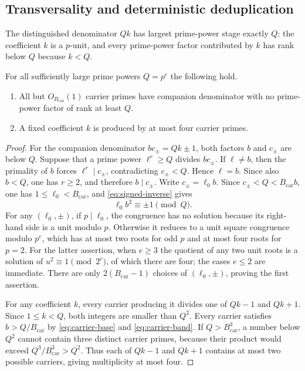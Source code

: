 \subsection{Transversality and deterministic deduplication}

The distinguished denominator $Qk$ has largest prime-power stage exactly $Q$: the coefficient $k$ is a $p$-unit, and every prime-power factor contributed by $k$ has rank below $Q$ because $k<Q$.

\begin{lemma}\label{lem:carrier-transversality}
For all sufficiently large prime powers $Q=p^e$ the following hold.
\begin{enumerate}
\item All but $O_{B_{\mathrm{car}}}(1)$ carrier primes have companion denominator with no prime-power factor of rank at least $Q$.
\item A fixed coefficient $k$ is produced by at most four carrier primes.
\end{enumerate}
\end{lemma}

\begin{proof}
For the companion denominator $bc_\pm=Qk\pm1$, both factors $b$ and $c_\pm$ are below $Q$.  Suppose that a prime power $\ell^r\ge Q$ divides $bc_\pm$.  If $\ell\ne b$, then the primality of $b$ forces $\ell^r\mid c_\pm$, contradicting $c_\pm<Q$.  Hence $\ell=b$.  Since also $b<Q$, one has $r\ge2$, and therefore $b\mid c_\pm$.  Write $c_\pm=\ell_0 b$.  Since $c_\pm<Q<B_{\mathrm{car}}b$, one has $1\le\ell_0<B_{\mathrm{car}}$, and \eqref{eq:signed-inverse} gives
\begin{equation}\label{eq:bad-carrier}
\ell_0 b^2\equiv\pm1\pmod Q.
\end{equation}
For any $(\ell_0,\pm)$, if $p\mid\ell_0$, the congruence has no solution because its right-hand side is a unit modulo $p$.  Otherwise it reduces to a unit square congruence modulo $p^e$, which has at most two roots for odd $p$ and at most four roots for $p=2$.  For the latter assertion, when $e\ge3$ the quotient of any two unit roots is a solution of $u^2\equiv1\pmod{2^e}$, of which there are four; the cases $e\le2$ are immediate.  There are only $2(B_{\mathrm{car}}-1)$ choices of $(\ell_0,\pm)$, proving the first assertion.

For any coefficient $k$, every carrier producing it divides one of $Qk-1$ and $Qk+1$.  Since $1\le k<Q$, both integers are smaller than $Q^2$.  Every carrier satisfies $b>Q/B_{\mathrm{car}}$ by \eqref{eq:carrier-base} and \eqref{eq:carrier-band}.  If $Q>B_{\mathrm{car}}^3$, a number below $Q^2$ cannot contain three distinct carrier primes, because their product would exceed $Q^3/B_{\mathrm{car}}^3>Q^2$.  Thus each of $Qk-1$ and $Qk+1$ contains at most two possible carriers, giving multiplicity at most four.
\end{proof}

